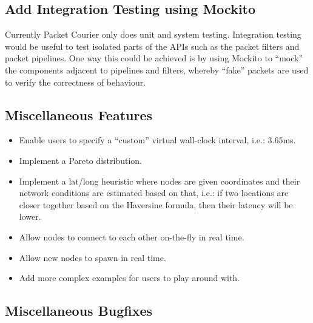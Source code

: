 \subsection{Add Integration Testing using Mockito}\label{subsection:add_integration_testing_using_mockito}

Currently Packet Courier only does unit and system testing. Integration testing would be useful to test isolated
parts of the APIs such as the packet filters and packet pipelines. One way this could be achieved is by using
Mockito\cite{mockito} to ``mock'' the components adjacent to pipelines and filters, whereby ``fake'' packets are used
to verify the correctness of behaviour.

\subsection{Miscellaneous Features}\label{subsection:miscellaneous_features}

\begin{itemize}
    \item Enable users to specify a ``custom'' virtual wall-clock interval, i.e.: 3.65ms.
    \item Implement a Pareto distribution.
    \item Implement a lat/long heuristic where nodes are given coordinates and their network conditions are estimated
    based on that, i.e.: if two locations are closer together based on the Haversine formula\cite{haversine_formula},
    then their latency will be lower.
    \item Allow nodes to connect to each other on-the-fly in real time.
    \item Allow new nodes to spawn in real time.
    \item Add more complex examples for users to play around with.
\end{itemize}

\subsection{Miscellaneous Bugfixes}\label{subsection:miscellaneous_bugfixes}

